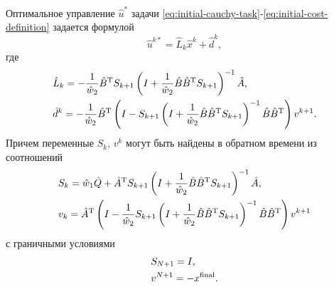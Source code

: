 \documentclass[../../doc.tex]{subfiles}
\begin{document}
    \begin{theorem}
        Оптимальное управление $\hat u^*$ задачи \eqref{eq:initial-cauchy-task}-\eqref{eq:initial-cost-definition} задается формулой
        \begin{equation}\label{eq:initial-optimal-control-result}
            \hat u^{k*} = \hat L_{k} \hat x^{k} + \hat d^k,
        \end{equation}
        где
        \begin{equation*}
            \begin{aligned}
                & \hat L_k = -\frac{1}{\hat w_2} \hat B^\textnormal{T} S_{k+1}\left( I + \frac{1}{\hat w_2} \hat B \hat B^\textnormal{T} S_{k+1} \right)^{-1} \hat A,
                \\
                & \hat d^k = -\frac{1}{\hat w_2} \hat B^\textnormal{T} \left( I - S_{k+1} \left( I + \frac{1}{\hat w_2} \hat B \hat B^\textnormal{T} S_{k+1} \right)^{-1} \hat B \hat B^\textnormal{T} \right) v^{k+1}.
            \end{aligned}
        \end{equation*}
        Причем переменные $S_{k}$, $v^{k}$ могут быть найдены в обратном времени из соотношений
        \begin{equation}\label{eq:initial-S-v-result}
            \begin{aligned}
                &
                        S_k
                    =    
                            \hat w_1 \hat Q
                        +
                            \hat A^\textnormal{T} S_{k+1} \left(
                                    I + \frac{1}{\hat w_2} \hat B \hat B^\textnormal{T} S_{k+1}     
                            \right)^{-1} \hat A
                    ,
                \\
                &
                        v_k
                    =
                        \hat A^\textnormal{T}
                        \left(
                            I - \frac{1}{\hat w_2} S_{k+1} \left(
                                I + \frac{1}{\hat w_2} \hat B \hat B^\textnormal{T} S_{k+1}     
                        \right)^{-1} \hat B \hat B^\textnormal{T}
                        \right)
                        v^{k+1}
            \end{aligned}
        \end{equation}
        с граничными условиями
        \begin{equation}\label{eq:initial-S-v-boundary-condition}
            \begin{aligned}
                & S_{N+1} = I,
                \\
                & v^{N+1} = - x^{\textnormal{final}}.
            \end{aligned}
        \end{equation}
    \end{theorem}
    
\end{document}
